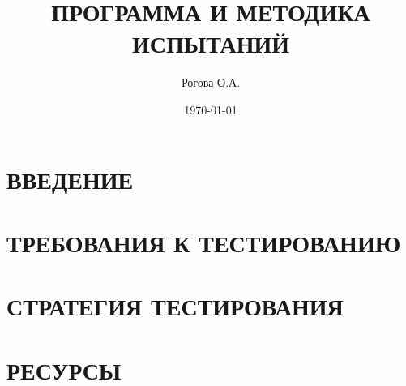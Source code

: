 \documentclass[a4paper,12pt]{article}
\author{Рогова О.А.}
\title{ПРОГРАММА И МЕТОДИКА ИСПЫТАНИЙ}
\date{\today}
\begin{document}
	\maketitle
	
	\section{ВВЕДЕНИЕ}
	
	\section{ТРЕБОВАНИЯ К ТЕСТИРОВАНИЮ}
	
	\section{СТРАТЕГИЯ ТЕСТИРОВАНИЯ}
	
	\section{РЕСУРСЫ}
\end{document}
